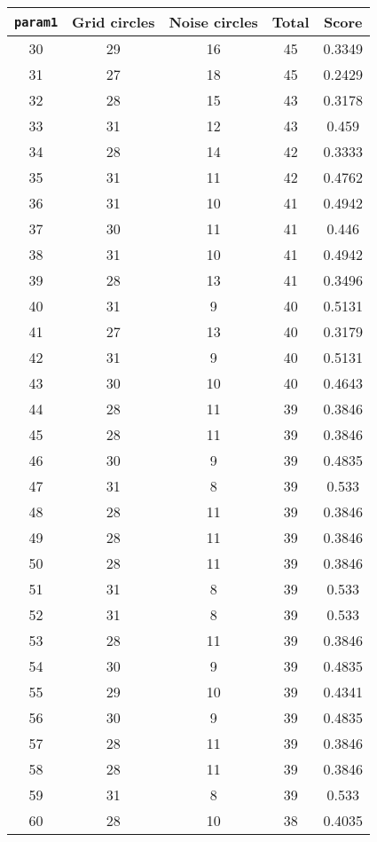 \documentclass[letterpaper, 12pt]{article}
\begin{document}
\begin{longtable}{|c|c|c|c|c|}
\hline
\textbf{\texttt{param1}} & \textbf{Grid circles} & \textbf{Noise circles} & \textbf{Total} & \textbf{Score} \\
\hline
30 & 29 & 16 & 45 & 0.3349 \\
\hline
31 & 27 & 18 & 45 & 0.2429 \\
\hline
32 & 28 & 15 & 43 & 0.3178 \\
\hline
33 & 31 & 12 & 43 & 0.459 \\
\hline
34 & 28 & 14 & 42 & 0.3333 \\
\hline
35 & 31 & 11 & 42 & 0.4762 \\
\hline
36 & 31 & 10 & 41 & 0.4942 \\
\hline
37 & 30 & 11 & 41 & 0.446 \\
\hline
38 & 31 & 10 & 41 & 0.4942 \\
\hline
39 & 28 & 13 & 41 & 0.3496 \\
\hline
40 & 31 & 9 & 40 & 0.5131 \\
\hline
41 & 27 & 13 & 40 & 0.3179 \\
\hline
42 & 31 & 9 & 40 & 0.5131 \\
\hline
43 & 30 & 10 & 40 & 0.4643 \\
\hline
44 & 28 & 11 & 39 & 0.3846 \\
\hline
45 & 28 & 11 & 39 & 0.3846 \\
\hline
46 & 30 & 9 & 39 & 0.4835 \\
\hline
47 & 31 & 8 & 39 & 0.533 \\
\hline
48 & 28 & 11 & 39 & 0.3846 \\
\hline
49 & 28 & 11 & 39 & 0.3846 \\
\hline
50 & 28 & 11 & 39 & 0.3846 \\
\hline
51 & 31 & 8 & 39 & 0.533 \\
\hline
52 & 31 & 8 & 39 & 0.533 \\
\hline
53 & 28 & 11 & 39 & 0.3846 \\
\hline
54 & 30 & 9 & 39 & 0.4835 \\
\hline
55 & 29 & 10 & 39 & 0.4341 \\
\hline
56 & 30 & 9 & 39 & 0.4835 \\
\hline
57 & 28 & 11 & 39 & 0.3846 \\
\hline
58 & 28 & 11 & 39 & 0.3846 \\
\hline
59 & 31 & 8 & 39 & 0.533 \\
\hline
60 & 28 & 10 & 38 & 0.4035 \\

\end{longtable}
\end{document}
